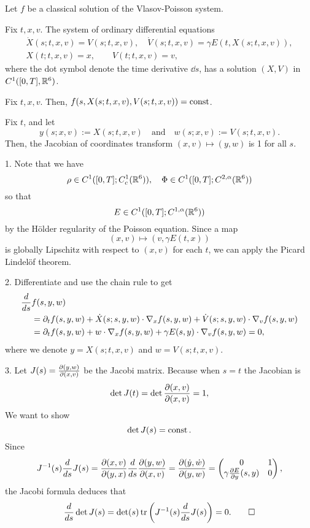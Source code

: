 \documentclass[11pt]{amsart}
\begin{document}
\begin{lem}
Let $f$ be a classical solution of the Vlasov-Poisson system.
\begin{ol}
\item Fix $t,x,v$. The system of ordinary differential equations
\begin{gather*}
\dot X(s;t,x,v)=V(s;t,x,v),\quad\dot V(s;t,x,v)=\gamma E(t,X(s;t,x,v)),\\
X(t;t,x,v)=x,\qquad V(t;t,x,v)=v,
\end{gather*}
where the dot symbol denote the time derivative $\dd{s}$, has a solution $(X,V)$ in $C^1([0,T],\mathbb{R}^6)$.
\item Fix $t,x,v$. Then, $f(s,X(s;t,x,v),V(s;t,x,v))=\operatorname{const}$.
\item Fix $t$, and let
\[y(s;x,v):=X(s;t,x,v)\quad\text{and}\quad w(s;x,v):=V(s;t,x,v).\]
Then, the Jacobian of coordinates transform $(x,v)\mapsto(y,w)$ is 1 for all $s$.
\end{ol}
\end{lem}
\begin{pf}
1.
Note that we have
\[\rho\in C^1([0,T];C_c^1(\mathbb{R}^6)),\quad\Phi\in C^1([0,T];C^{2,\alpha}(\mathbb{R}^6))\]
so that
\[E\in C^1([0,T];C^{1,\alpha}(\mathbb{R}^6))\]
by the H\"older regularity of the Poisson equation.
Since a map
\[(x,v)\mapsto(v,\gamma E(t,x))\]
is globally Lipschitz with respect to $(x,v)$ for each $t$, we can apply the Picard Lindel\"of theorem.

2.
Differentiate and use the chain rule to get
\begin{align*}
\dd{s}&f(s,y,w)\\
&=\pd_tf(s,y,w)+\dot X(s;s,y,w)\cdot\del_xf(s,y,w)+\dot V(s;s,y,w)\cdot\del_vf(s,y,w)\\
&=\pd_tf(s,y,w)+w\cdot\del_xf(s,y,w)+\gamma E(s,y)\cdot\del_vf(s,y,w)=0,
\end{align*}
where we denote $y=X(s;t,x,v)$ and $w=V(s;t,x,v)$.

3.
Let $J(s)=\pd{(y,w)}{(x,v)}$ be the Jacobi matrix.
Because when $s=t$ the Jacobian is
\[\det J(t)=\det\pd{(x,v)}{(x,v)}=1,\]
We want to show
\[\det J(s)=\operatorname{const}.\]
Since
\[J^{-1}(s)\dd{s}J(s)=\pd{(x,v)}{(y,x)}\dd{s}\pd{(y,w)}{(x,v)}=\pd{(\dot y,\dot w)}{(y,w)}=\mat{0&1\\\gamma\pd{E}{y}(s,y)&0},\]
the Jacobi formula deduces that
\[\dd{s}\det J(s)=\det(s)\tr\left(J^{-1}(s)\dd{s}J(s)\right)=0.\qedhere\]
\end{pf}
\end{document}
